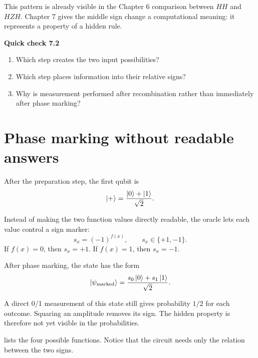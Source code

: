 This pattern is already visible in the Chapter 6 comparison between $H H$ and $H Z H$. Chapter 7 gives the middle sign change a computational meaning: it represents a property of a hidden rule.

\begin{checkpoint}
\textbf{Quick check 7.2}
\begin{enumerate}
  \item Which step creates the two input possibilities?
  \item Which step places information into their relative signs?
  \item Why is measurement performed after recombination rather than immediately after phase marking?
\end{enumerate}
\end{checkpoint}

\section{Phase marking without readable answers}
\label{sec:ch07-phase-marking}

After the preparation step, the first qubit is
\begin{equation}
\ket{+}=\frac{\ket{0}+\ket{1}}{\sqrt{2}}.
\end{equation}

Instead of making the two function values directly readable, the oracle lets each value control a sign marker:
\begin{equation}
s_x=(-1)^{f(x)},\qquad s_x\in\{+1,-1\}.
\label{eq:ch07-sign-marker}
\end{equation}
If $f(x)=0$, then $s_x=+1$. If $f(x)=1$, then $s_x=-1$.

After phase marking, the state has the form
\begin{equation}
\ket{\psi_{\mathrm{marked}}}
=\frac{s_0\ket{0}+s_1\ket{1}}{\sqrt{2}}.
\label{eq:ch07-marked-state}
\end{equation}

A direct 0/1 measurement of this state still gives probability $1/2$ for each outcome. Squaring an amplitude removes its sign. The hidden property is therefore not yet visible in the probabilities.

 lists the four possible functions. Notice that the circuit needs only the relation between the two signs.

